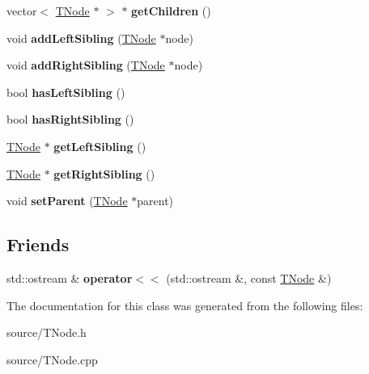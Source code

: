 \begin{DoxyCompactItemize}
\item 
\hypertarget{class_t_node_a682761483c9b9b1f72a95f815583aabc}{}vector$<$ \hyperlink{class_t_node}{T\+Node} $\ast$ $>$ $\ast$ {\bfseries get\+Children} ()\label{class_t_node_a682761483c9b9b1f72a95f815583aabc}

\item 
\hypertarget{class_t_node_ab37c3df2f608068ceb0364ce348fd64c}{}void {\bfseries add\+Left\+Sibling} (\hyperlink{class_t_node}{T\+Node} $\ast$node)\label{class_t_node_ab37c3df2f608068ceb0364ce348fd64c}

\item 
\hypertarget{class_t_node_a624465c60f04f33da47f71ab81ab94b8}{}void {\bfseries add\+Right\+Sibling} (\hyperlink{class_t_node}{T\+Node} $\ast$node)\label{class_t_node_a624465c60f04f33da47f71ab81ab94b8}

\item 
\hypertarget{class_t_node_a4df99297c8a4817b647abeb67b5e4df5}{}bool {\bfseries has\+Left\+Sibling} ()\label{class_t_node_a4df99297c8a4817b647abeb67b5e4df5}

\item 
\hypertarget{class_t_node_aa68ce4155371ad2221945ef5625bbb5d}{}bool {\bfseries has\+Right\+Sibling} ()\label{class_t_node_aa68ce4155371ad2221945ef5625bbb5d}

\item 
\hypertarget{class_t_node_a8a8fe328f46ec78172157aacb7d27094}{}\hyperlink{class_t_node}{T\+Node} $\ast$ {\bfseries get\+Left\+Sibling} ()\label{class_t_node_a8a8fe328f46ec78172157aacb7d27094}

\item 
\hypertarget{class_t_node_a725f9415782b117e161ffb55cbceed87}{}\hyperlink{class_t_node}{T\+Node} $\ast$ {\bfseries get\+Right\+Sibling} ()\label{class_t_node_a725f9415782b117e161ffb55cbceed87}

\item 
\hypertarget{class_t_node_a268a84ac70bea458a3fb9cc4d3e2c27e}{}void {\bfseries set\+Parent} (\hyperlink{class_t_node}{T\+Node} $\ast$parent)\label{class_t_node_a268a84ac70bea458a3fb9cc4d3e2c27e}

\end{DoxyCompactItemize}
\subsection*{Friends}
\begin{DoxyCompactItemize}
\item 
\hypertarget{class_t_node_a09e86f4f4b29e328e2c1739fba7ed74d}{}std\+::ostream \& {\bfseries operator$<$$<$} (std\+::ostream \&, const \hyperlink{class_t_node}{T\+Node} \&)\label{class_t_node_a09e86f4f4b29e328e2c1739fba7ed74d}

\end{DoxyCompactItemize}


The documentation for this class was generated from the following files\+:\begin{DoxyCompactItemize}
\item 
source/T\+Node.\+h\item 
source/T\+Node.\+cpp\end{DoxyCompactItemize}
